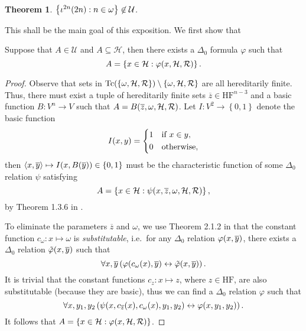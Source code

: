 \documentclass[11pt]{article}
\theoremstyle{plain}
\newtheorem{theorem}{Theorem}
\theoremstyle{definition}
\newcommand{\tuple}[1]{\left\langle #1 \right\rangle}
\newcommand{\HF}{\mathrm{HF}}
\DeclareMathOperator{\Tc}{Tc}
\begin{document}
\begin{theorem}
  \label{thm:U-has-no-even-set}
  $\left\{\iota^{2n}\mleft(2n\mright) : n \in \omega\right\} \not\in \mathcal{U}$.
\end{theorem}

This shall be the main goal of this exposition. We first show that

\begin{lemma}
  \label{lem:first}
  Suppose that $A \in \mathcal{U}$ and $A \subseteq \mathcal{H}$, then there exists a $\Delta_0$ formula $\varphi$ such that
  \[A = \left\{x \in \mathcal{H} : \varphi\mleft(x, \mathcal{H}, \mathcal{R}\mright)\right\}.\]
\end{lemma}

\begin{proof}
  Observe that sets in $\Tc\mleft(\left\{\omega, \mathcal{H}, \mathcal{R}\right\}\mright) \setminus \left\{\omega, \mathcal{H}, \mathcal{R}\right\}$ are all hereditarily finite. Thus, there must exist a tuple of hereditarily finite sets $\overline{z} \in \HF^{n - 3}$ and a basic function $B : V^n \rightarrow V$ such that $A = B\mleft(\overline{z}, \omega, \mathcal{H}, \mathcal{R}\mright)$. Let $I : V^2 \rightarrow \left\{0, 1\right\}$ denote the basic function
  \[I\mleft(x, y\mright) = \left\{\begin{aligned}
       & 1 &  & \text{if $x \in y$}, \\
       & 0 &  & \text{otherwise},
    \end{aligned}\right.\]
  then $\tuple{x, \overline{y}} \mapsto I\mleft(x, B\mleft(\overline{y}\mright)\mright) \in \left\{0, 1\right\}$ must be the characteristic function of some $\Delta_0$ relation $\psi$ satisfying
  \[A = \left\{x \in \mathcal{H} : \psi\mleft(x, \overline{z}, \omega, \mathcal{H}, \mathcal{R}\mright)\right\},\]
  by Theorem 1.3.6 in \cite{gandy74-set-functions}.

  To eliminate the parameters $\overline{z}$ and $\omega$, we use Theorem 2.1.2 in \cite{gandy74-set-functions} that the constant function $c_\omega : x \mapsto \omega$ is \emph{substitutable}, i.e.\ for any $\Delta_0$ relation $\varphi\mleft(x, \overline{y}\mright)$, there exists a $\Delta_0$ relation $\tilde{\varphi}\mleft(x, \overline{y}\mright)$ such that
  \[\forall x, \overline{y} \left(\varphi\mleft(c_\omega\mleft(x\mright), \overline{y}\mright) \leftrightarrow \tilde{\varphi}\mleft(x, \overline{y}\mright)\right).\]
  It is trivial that the constant functions $c_z : x \mapsto z$, where $z \in \HF$, are also substitutable (because they are basic), thus we can find a $\Delta_0$ relation $\varphi$ such that
  \[\forall x, y_1, y_2 \left(\psi\mleft(x, c_{\overline{z}}\mleft(x\mright), c_\omega\mleft(x\mright), y_1, y_2\mright) \leftrightarrow \varphi\mleft(x, y_1, y_2\mright)\right).\]
  It follows that $A = \left\{x \in \mathcal{H} : \varphi\mleft(x, \mathcal{H}, \mathcal{R}\mright)\right\}$.
\end{proof}
\end{document}
